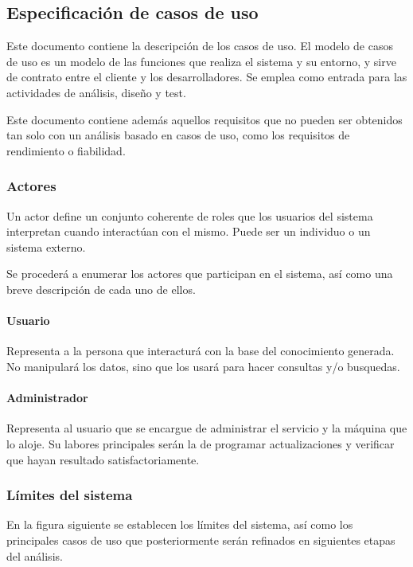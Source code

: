 
\subsection{Especificación de casos de uso}

Este documento contiene la descripción de los casos de uso. El modelo 
de casos de uso es un modelo de las funciones que realiza el sistema y 
su entorno, y sirve de contrato entre el cliente y los desarrolladores. 
Se emplea como entrada para las actividades de análisis, diseño y test.

Este documento contiene además aquellos requisitos que no pueden ser 
obtenidos tan solo con un análisis basado en casos de uso, como los 
requisitos de rendimiento o fiabilidad.

\subsubsection{Actores}

Un actor define un conjunto coherente de roles que los usuarios del 
sistema interpretan cuando interactúan con el mismo. Puede ser un 
individuo o un sistema externo.

Se procederá a enumerar los actores que participan en el sistema, 
así como una breve descripción de cada uno de ellos.

\paragraph{Usuario} Representa a la persona que interacturá con la
base del conocimiento generada. No manipulará los datos, sino que los
usará para hacer consultas y/o busquedas.

\paragraph{Administrador} Representa al usuario que se encargue de 
administrar el servicio y la máquina que lo aloje. Su labores principales
serán la de programar actualizaciones y verificar que hayan resultado
satisfactoriamente.

\subsubsection{Límites del sistema}

En la figura siguiente se establecen los límites del sistema, así 
como los principales casos de uso que posteriormente serán refinados 
en siguientes etapas del análisis.

